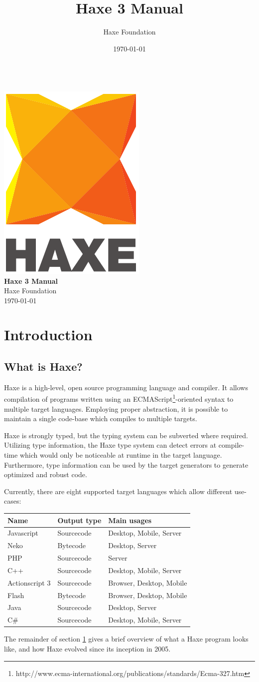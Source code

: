 \documentclass{haxe}
\renewcommand{\maketitle}{
   \begin{titlepage}
     \setcounter{page}{-1}
			\begin{center}
				~\\[3cm]
				\includegraphics[scale=1.25]{assets/logo.pdf}~\\[1cm]
				{\huge \bfseries Haxe 3 Manual}\\[7cm]
				Haxe Foundation\\
				\today
			\end{center}
   \end{titlepage}
}
\begin{document}
\title{Haxe 3 Manual}
\author{Haxe Foundation}
\date{\today}
\maketitle


\clearpage
\todototoc
\listoftodos
\clearpage

\clearpage
\tableofcontents
\clearpage

\chapter{Introduction}
\label{introduction}

\section{What is Haxe?}
\label{introduction-what-is-haxe}


Haxe is a high-level, open source programming language and compiler. It allows compilation of programs written using an ECMAScript\footnote{http://www.ecma-international.org/publications/standards/Ecma-327.htm}-oriented syntax to multiple target languages. Employing proper abstraction, it is possible to maintain a single code-base which compiles to multiple targets.

Haxe is strongly typed, but the typing system can be subverted where required. Utilizing type information, the Haxe type system can detect errors at compile-time which would only be noticeable at runtime in the target language. Furthermore, type information can be used by the target generators to generate optimized and robust code.

Currently, there are eight supported target languages which allow different use-cases:

\begin{center}
\begin{tabular}{| l | l | l |}
	\hline
	Name & Output type & Main usages \\ \hline
	Javascript & Sourcecode & Desktop, Mobile, Server \\
	Neko & Bytecode & Desktop, Server \\
	PHP & Sourcecode & Server \\
	C++ & Sourcecode & Desktop, Mobile, Server \\
	Actionscript 3 & Sourcecode & Browser, Desktop, Mobile \\
	Flash & Bytecode & Browser, Desktop, Mobile \\ 
	Java & Sourcecode & Desktop, Server \\
	C\# & Sourcecode & Desktop, Mobile, Server \\ \hline
\end{tabular}
\end{center}
The remainder of section \ref{introduction} gives a brief overview of what a Haxe program looks like, and how Haxe evolved since its inception in 2005.
\end{document}
